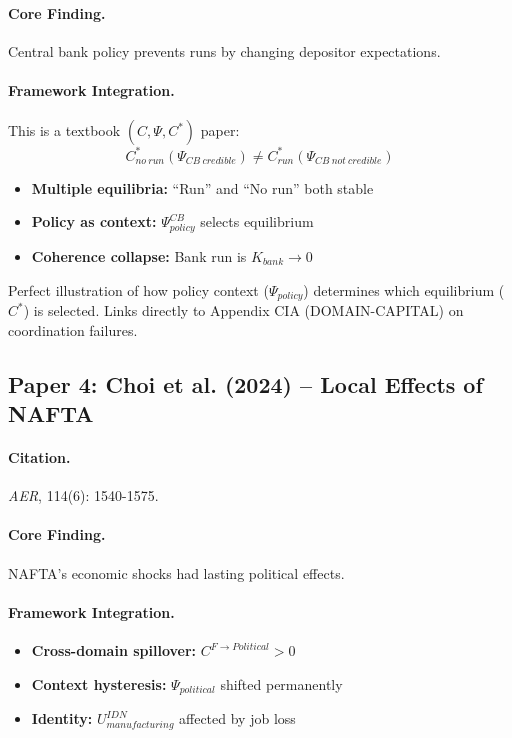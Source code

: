 \paragraph{Core Finding.}
Central bank policy prevents runs by changing depositor expectations.

\paragraph{Framework Integration.}
This is a textbook $(C, \Psi, C^*)$ paper:
\begin{equation}
  C^*_{no\ run}(\Psi_{CB\ credible}) \neq C^*_{run}(\Psi_{CB\ not\ credible})
\end{equation}
\begin{itemize}
  \item \textbf{Multiple equilibria:} ``Run'' and ``No run'' both stable
  \item \textbf{Policy as context:} $\Psi_{policy}^{CB}$ selects equilibrium
  \item \textbf{Coherence collapse:} Bank run is $K_{bank} \to 0$
\end{itemize}

\begin{tcolorbox}[colback=yellow!5!white, colframe=yellow!75!black,
    title=EBF Insight: Bank Runs]
Perfect illustration of how policy context ($\Psi_{policy}$) determines
which equilibrium ($C^*$) is selected. Links directly to Appendix CIA
(DOMAIN-CAPITAL) on coordination failures.
\end{tcolorbox}


\subsection{Paper 4: Choi et al. (2024) -- Local Effects of NAFTA}

\paragraph{Citation.}
\emph{AER}, 114(6): 1540-1575.

\paragraph{Core Finding.}
NAFTA's economic shocks had lasting political effects.

\paragraph{Framework Integration.}
\begin{itemize}
  \item \textbf{Cross-domain spillover:} $C^{F \to Political} > 0$
  \item \textbf{Context hysteresis:} $\Psi_{political}$ shifted permanently
  \item \textbf{Identity:} $U^{IDN}_{manufacturing}$ affected by job loss
\end{itemize}

